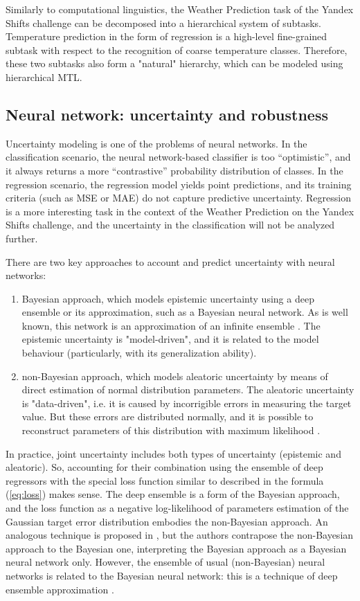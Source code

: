 \documentclass{article}
\begin{document}
Similarly to computational linguistics, the Weather Prediction task of the Yandex Shifts challenge can be decomposed into a hierarchical system of subtasks. Temperature prediction in the form of regression is a high-level fine-grained subtask with respect to the recognition of coarse temperature classes. Therefore, these two subtasks also form a "natural" hierarchy, which can be modeled using hierarchical MTL.

\subsection{Neural network: uncertainty and robustness}

Uncertainty modeling is one of the problems of neural networks. In the classification scenario, the neural network-based classifier is too “optimistic”, and it always returns a more “contrastive” probability distribution of classes. In the regression scenario, the regression model yields point predictions, and its training criteria (such as MSE or MAE) do not capture predictive uncertainty. Regression is a more interesting task in the context of the Weather Prediction on the Yandex Shifts challenge, and the uncertainty in the classification will not be analyzed further.

There are two key approaches to account and predict uncertainty with neural networks:

\begin{enumerate}
    \item Bayesian approach, which models epistemic uncertainty using a deep ensemble or its approximation, such as a Bayesian neural network. As is well known, this network is an approximation of an infinite ensemble \cite{Blundell2015}. The epistemic uncertainty is "model-driven", and it is related to the model behaviour (particularly, with its generalization ability).
    \item non-Bayesian approach, which models aleatoric uncertainty by means of direct estimation of normal distribution parameters. The aleatoric uncertainty is "data-driven", i.e. it is caused by incorrigible errors in measuring the target value. But these errors are distributed normally, and it is possible to reconstruct parameters of this distribution with maximum likelihood \cite{Nix1994EstimatingTM}.
\end{enumerate}

In practice, joint uncertainty includes both types of uncertainty (epistemic and aleatoric). So, accounting for their combination using the ensemble of deep regressors with the special loss function similar to described in the formula (\ref{eq:loss}) makes sense. The deep ensemble is a form of the Bayesian approach, and the loss function as a negative log-likelihood of parameters estimation of the Gaussian target error distribution embodies the non-Bayesian approach. An analogous technique is proposed in \cite{uncertainty2017}, but the authors contrapose the non-Bayesian approach to the Bayesian one, interpreting the Bayesian approach as a Bayesian neural network only. However, the ensemble of usual (non-Bayesian) neural networks is related to the Bayesian neural network: this is a technique of deep ensemble approximation \cite{Blundell2015, Wilson2020BayesianDL}.
\end{document}
